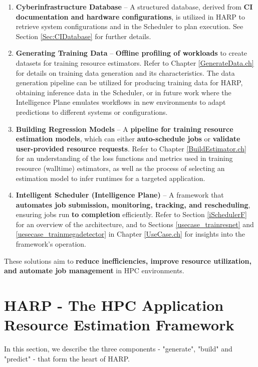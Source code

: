 \begin{enumerate}
    \item \textbf{Cyberinfrastructure Database} – A structured database, derived from \textbf{CI documentation and hardware configurations}, is utilized in HARP to retrieve system configurations and in the Scheduler to plan execution. See Section \ref{Sec:CIDatabase} for further details.
    \item \textbf{Generating Training Data} – \textbf{Offline profiling of workloads} to create datasets for training resource estimators.  Refer to Chapter \ref{GenerateData.ch} for details on training data generation and its characteristics. The data generation pipeline can be utilized for producing training data for HARP, obtaining inference data in the Scheduler, or in future work where the Intelligence Plane emulates workflows in new environments to adapt predictions to different systems or configurations.
    \item \textbf{Building Regression Models} – A \textbf{pipeline for training resource estimation models}, which can either \textbf{auto-schedule jobs} or \textbf{validate user-provided resource requests}. Refer to Chapter \ref{BuildEstimator.ch} for an understanding of the loss functions and metrics used in training resource (walltime) estimators, as well as the process of selecting an estimation model to infer runtimes for a targeted application.
    \item \textbf{Intelligent Scheduler (Intelligence Plane)} – A framework that \textbf{automates job submission, monitoring, tracking, and rescheduling}, ensuring jobs run \textbf{to completion} efficiently. Refer to Section \ref{iSchedulerF} for an overview of the architecture, and to Sections \ref{usecase_trainresnet} and \ref{uesecase_trainmegadetector} in Chapter \ref{UseCase.ch} for insights into the framework's operation.  
 
\end{enumerate}

\noindent
These solutions aim to \textbf{reduce inefficiencies, improve resource utilization, and automate job management} in HPC environments.  



\section{HARP - The HPC Application Resource Estimation Framework}
\label{HARP}
In this section, we describe the three components - "generate", "build" and "predict" - that form the heart of HARP. 

